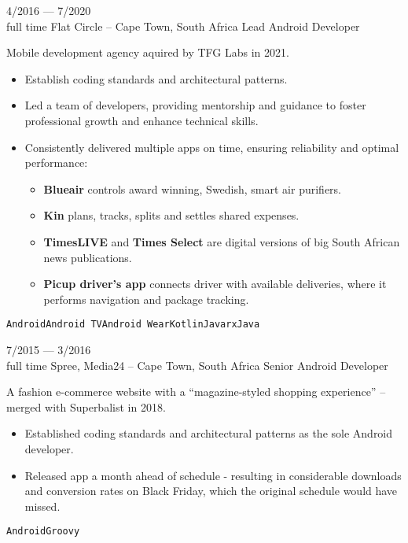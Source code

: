 \documentclass[9pt]{developercv} %
\begin{document}
\begin{entrylist}
    \entry
		{4/2016 --- 7/2020\\\footnotesize{full time}}
		{Flat Circle {\normalfont\small -- Cape Town, South Africa}}
		{Lead Android Developer}
		{
            Mobile development agency aquired by TFG Labs in 2021.
            \begin{itemize}[nosep, leftmargin=*]
                \item Establish coding standards and architectural patterns.
                \item Led a team of developers, providing mentorship and guidance to foster professional growth and enhance technical skills.
                \item Consistently delivered multiple apps on time, ensuring reliability and optimal performance: 
                \begin{itemize}
                    \item \textbf{Blueair} controls award winning, Swedish, smart air purifiers.
                    \item \textbf{Kin} plans, tracks, splits and settles shared expenses.
                    \item \textbf{TimesLIVE} and \textbf{Times Select} are digital versions of big South African news publications.
                    \item \textbf{Picup driver's app} connects driver with available deliveries, where it performs navigation and package tracking.
                \end{itemize}
            \end{itemize}
    		\texttt{Android}\pipesep\texttt{Android TV}\pipesep\texttt{Android Wear}\pipesep\texttt{Kotlin}\pipesep\texttt{Java}\pipesep\texttt{rxJava}
        }
  
	\entry
		{7/2015 --- 3/2016\\\footnotesize{full time}}
		{Spree, Media24 {\normalfont\small -- Cape Town, South Africa}}
		{Senior Android Developer}
		{
            A fashion e-commerce website with a “magazine-styled shopping experience” -- merged with Superbalist in 2018.
            \begin{itemize}[nosep, leftmargin=*]
                \item Established coding standards and architectural patterns as the sole Android developer.
                \item Released app a month ahead of schedule - resulting in considerable downloads and conversion rates on Black Friday, which the original schedule would have missed.
            \end{itemize}
            \texttt{Android}\pipesep\texttt{Groovy}
        }
        

\end{entrylist}
\end{document}
